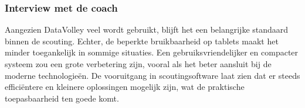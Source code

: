 \begin{enumerate}
  \subsubsection{Interview met de coach}
  Aangezien DataVolley veel wordt gebruikt, blijft het een belangrijke standaard binnen de scouting. Echter, de beperkte bruikbaarheid op tablets maakt het minder toegankelijk in sommige situaties. Een gebruiksvriendelijker en compacter systeem zou een grote verbetering zijn, vooral als het beter aansluit bij de moderne technologieën. De vooruitgang in scoutingsoftware laat zien dat er steeds efficiëntere en kleinere oplossingen mogelijk zijn, wat de praktische toepasbaarheid ten goede komt.
\end{enumerate}

